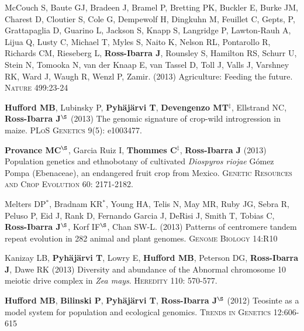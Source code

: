 \begin{etaremune}
\item McCouch S, Baute GJ, Bradeen J, Bramel P, Bretting PK, Buckler E, Burke JM, Charest D, Cloutier S, Cole G, Dempewolf H, Dingkuhn M, Feuillet C, Gepts, P, Grattapaglia D, Guarino L, Jackson S, Knapp S, Langridge P, Lawton-Rauh A, Lijua Q, Lusty C, Michael T, Myles S, Naito K, Nelson RL, Pontarollo R, Richards CM, Rieseberg L, {\bf Ross-Ibarra J}, Rounsley S, Hamilton RS, Schurr U, Stein N, Tomooka N, van der Knaap E, van Tassel D, Toll J, Valls J, Varshney RK, Ward J, Waugh R, Wenzl P, Zamir. (2013) Agriculture: Feeding the future. \textsc{Nature} 499:23-24


\item {\bf Hufford MB}, Lubinsky P, {\bf Pyh\"aj\"arvi T}, {\bf Devengenzo MT}$^\ddagger$, Ellstrand NC, {\bf Ross-Ibarra J}$^\S$ (2013) The genomic signature of crop-wild introgression in maize. \textsc{PLoS Genetics} 9(5): e1003477. %


\item {\bf Provance MC}$^\S$, Garcia Ruiz I, {\bf Thommes C}$^\ddagger$, {\bf Ross-Ibarra J} (2013) Population genetics and ethnobotany of cultivated \emph{Diospyros riojae} G\'omez Pompa (Ebenaceae), an endangered fruit crop from Mexico. \textsc{Genetic Resources and Crop Evolution} 60: 2171-2182.


\item Melters DP$^*$, Bradnam KR$^*$, Young HA, Telis N, May MR, Ruby JG, Sebra R, Peluso P, Eid J, Rank D, Fernando Garcia J, DeRisi J, Smith T, Tobias C, {\bf Ross-Ibarra J}$^\S$, Korf IF$^\S$, Chan SW-L. (2013) Patterns of centromere tandem repeat evolution in 282 animal and plant genomes. \textsc{Genome Biology} 14:R10


\item Kanizay LB, {\bf Pyh\"aj\"arvi T}, Lowry E, {\bf Hufford MB}, Peterson DG, {\bf Ross-Ibarra J}, Dawe RK (2013) Diversity and abundance of the Abnormal chromosome 10 meiotic drive complex in \emph{Zea mays}. \textsc{Heredity} 110: 570-577.


\item {\bf Hufford MB}, {\bf Bilinski P}, {\bf Pyh\"aj\"arvi T}, {\bf Ross-Ibarra J}$^\S$ (2012) Teosinte as a model system for population and ecological genomics. \textsc{Trends in Genetics} 12:606-615 %



\end{etaremune}
